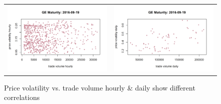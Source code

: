 \documentclass[12pt]{article}
\begin{document}
\begin{figure}[H]
	\begin{center}
		\begin{tabular}{ll}
			\includegraphics[width=8cm]{GE2016-09-19hourly.png} &
			\includegraphics[width=8cm]{GE2016-09-19daily.png} \\
		\end{tabular}
	\end{center}
	\caption{Price volatility vs. trade volume hourly \& daily show different correlations}
	\label{fig: 14}
\end{figure}
\end{document}
